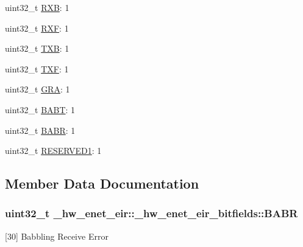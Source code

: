 \begin{DoxyCompactItemize}
uint32\+\_\+t \hyperlink{struct__hw__enet__eir_1_1__hw__enet__eir__bitfields_ae5cd962e945b245999f72097833ed1cf}{R\+XB}\+: 1
\item 
uint32\+\_\+t \hyperlink{struct__hw__enet__eir_1_1__hw__enet__eir__bitfields_ae83bfb80407f44503641f6ae1f577d4b}{R\+XF}\+: 1
\item 
uint32\+\_\+t \hyperlink{struct__hw__enet__eir_1_1__hw__enet__eir__bitfields_a964e48bc7bf31a85794845b81305b615}{T\+XB}\+: 1
\item 
uint32\+\_\+t \hyperlink{struct__hw__enet__eir_1_1__hw__enet__eir__bitfields_aa9ae83ce1a1ca5325ec6c249e74ab999}{T\+XF}\+: 1
\item 
uint32\+\_\+t \hyperlink{struct__hw__enet__eir_1_1__hw__enet__eir__bitfields_a48a0c8701018e94dc4d49b59f9079ac3}{G\+RA}\+: 1
\item 
uint32\+\_\+t \hyperlink{struct__hw__enet__eir_1_1__hw__enet__eir__bitfields_a5800aa7fd1279e1769c4b5bdfc82ad51}{B\+A\+BT}\+: 1
\item 
uint32\+\_\+t \hyperlink{struct__hw__enet__eir_1_1__hw__enet__eir__bitfields_a3603c9c66ee0e341372712c416d57fea}{B\+A\+BR}\+: 1
\item 
uint32\+\_\+t \hyperlink{struct__hw__enet__eir_1_1__hw__enet__eir__bitfields_a3f6f4aa1e4c0e2794b2d8b78a23e38f6}{R\+E\+S\+E\+R\+V\+E\+D1}\+: 1
\end{DoxyCompactItemize}


\subsection{Member Data Documentation}
\subsubsection[{\texorpdfstring{B\+A\+BR}{BABR}}]{\setlength{\rightskip}{0pt plus 5cm}uint32\+\_\+t \+\_\+hw\+\_\+enet\+\_\+eir\+::\+\_\+hw\+\_\+enet\+\_\+eir\+\_\+bitfields\+::\+B\+A\+BR}\hypertarget{struct__hw__enet__eir_1_1__hw__enet__eir__bitfields_a3603c9c66ee0e341372712c416d57fea}{}\label{struct__hw__enet__eir_1_1__hw__enet__eir__bitfields_a3603c9c66ee0e341372712c416d57fea}
\mbox{[}30\mbox{]} Babbling Receive Error 
